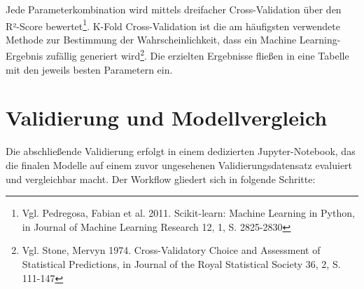 Jede Parameterkombination wird mittels dreifacher Cross-Validation über den R²-Score bewertet\footnote{Vgl. Pedregosa, Fabian et al. 2011. Scikit-learn: Machine Learning in Python, in Journal of Machine Learning Research 12, 1, S. 2825-2830}. K-Fold Cross-Validation ist die am häufigsten verwendete Methode zur Bestimmung der Wahrscheinlichkeit, dass ein Machine Learning-Ergebnis zufällig generiert wird\footnote{Vgl. Stone, Mervyn 1974. Cross-Validatory Choice and Assessment of Statistical Predictions, in Journal of the Royal Statistical Society 36, 2, S. 111-147}. Die erzielten Ergebnisse fließen in eine Tabelle mit den jeweils besten Parametern ein.

\section{Validierung und Modellvergleich}
\label{sec:validierung_modellvergleich}

Die abschließende Validierung erfolgt in einem dedizierten Jupyter-Notebook, das die finalen Modelle auf einem zuvor ungesehenen Validierungsdatensatz evaluiert und vergleichbar macht. Der Workflow gliedert sich in folgende Schritte:

